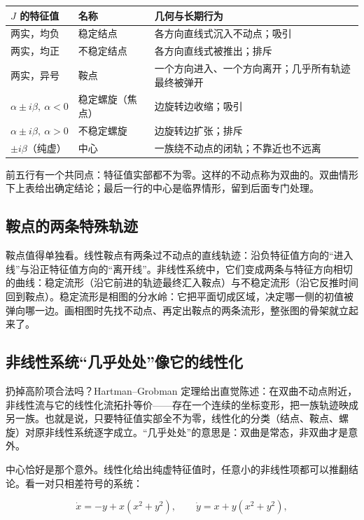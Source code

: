 {\def\LTcaptype{none} %
\begin{longtable}{@{}llp{5.6cm}@{}}
\toprule\noalign{}
\(J\) 的特征值 & 名称 & 几何与长期行为 \\
\midrule\noalign{}
\endhead
\bottomrule\noalign{}
\endlastfoot
两实，均负 & 稳定结点 & 各方向直线式沉入不动点；吸引 \\
两实，均正 & 不稳定结点 & 各方向直线式被推出；排斥 \\
两实，异号 & 鞍点 & 一个方向进入、一个方向离开；几乎所有轨迹最终被弹开 \\
\(\alpha\pm i\beta,\ \alpha<0\) & 稳定螺旋（焦点） & 边旋转边收缩；吸引 \\
\(\alpha\pm i\beta,\ \alpha>0\) & 不稳定螺旋 & 边旋转边扩张；排斥 \\
\(\pm i\beta\)（纯虚） & 中心 & 一族绕不动点的闭轨；不靠近也不远离 \\
\end{longtable}
}

前五行有一个共同点：特征值实部都不为零。这样的不动点称为双曲的。双曲情形下上表给出确定结论；最后一行的中心是临界情形，留到后面专门处理。

\subsection{鞍点的两条特殊轨迹}

鞍点值得单独看。线性鞍点有两条过不动点的直线轨迹：沿负特征值方向的``进入线''与沿正特征值方向的``离开线''。非线性系统中，它们变成两条与特征方向相切的曲线：稳定流形（沿它前进的轨迹最终汇入鞍点）与不稳定流形（沿它反推时间回到鞍点）。稳定流形是相图的分水岭：它把平面切成区域，决定哪一侧的初值被弹向哪一边。画相图时先找不动点、再定出鞍点的两条流形，整张图的骨架就立起来了。

\subsection{非线性系统``几乎处处''像它的线性化}

扔掉高阶项合法吗？Hartman--Grobman 定理给出直觉陈述：在双曲不动点附近，非线性流与它的线性化流拓扑等价——存在一个连续的坐标变形，把一族轨迹映成另一族。也就是说，只要特征值实部全不为零，线性化的分类（结点、鞍点、螺旋）对原非线性系统逐字成立。``几乎处处''的意思是：双曲是常态，非双曲才是意外。

中心恰好是那个意外。线性化给出纯虚特征值时，任意小的非线性项都可以推翻结论。看一对只相差符号的系统：

\[
\dot x=-y+x(x^2+y^2),
\qquad
\dot y=x+y(x^2+y^2),
\]

